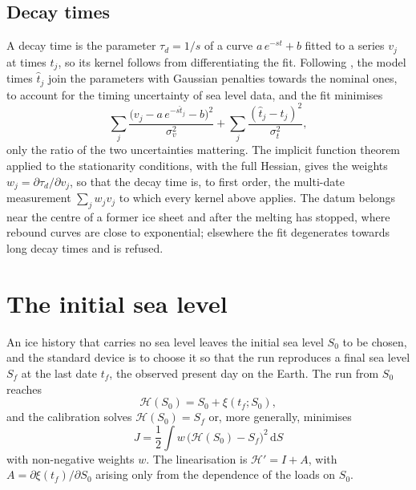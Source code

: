 \documentclass[11pt,a4paper]{article}
\newcommand{\dd}{\mathrm{d}}
\numberwithin{equation}{section}
\begin{document}
\subsection{Decay times}

A decay time is the parameter $\tau_{d}=1/s$ of a curve $a\,e^{-st}+b$ fitted
to a series $v_{j}$ at times $t_{j}$, so its kernel follows from differentiating
the fit. Following \citet[Appendix C]{AlAttarTromp2014}, the model times
$\hat t_{j}$ join the parameters with Gaussian penalties towards the nominal
ones, to account for the timing uncertainty of sea level data, and the fit
minimises
\begin{equation}
\sum_{j}\frac{\big(v_{j} - a\,e^{-s\hat t_{j}} - b\big)^{2}}{\sigma_{v}^{2}}
 + \sum_{j}\frac{(\hat t_{j}-t_{j})^{2}}{\sigma_{t}^{2}},
\end{equation}
only the ratio of the two uncertainties mattering. The implicit function
theorem applied to the stationarity conditions, with the full Hessian, gives
the weights $w_{j} = \partial\tau_{d}/\partial v_{j}$, so that the decay time is,
to first order, the multi-date measurement $\sum_{j}w_{j}v_{j}$ to which every
kernel above applies. The datum belongs near the centre of a former ice sheet
and after the melting has stopped, where rebound curves are close to
exponential; elsewhere the fit degenerates towards long decay times and is
refused.

\section{The initial sea level}
\label{sec:calibration}

An ice history that carries no sea level leaves the initial sea level $S_{0}$
to be chosen, and the standard device is to choose it so that the run
reproduces a final sea level $S_{f}$ at the last date $t_{f}$, the observed
present day on the Earth. The run from $S_{0}$ reaches
\begin{equation}
\mathcal{H}(S_{0}) = S_{0} + \xi(t_{f};S_{0}),
\end{equation}
and the calibration solves $\mathcal{H}(S_{0}) = S_{f}$ or, more generally,
minimises
\begin{equation}
J = \frac{1}{2}\int w\,\big(\mathcal{H}(S_{0}) - S_{f}\big)^{2}\,\dd S
\label{eq:calmisfit}
\end{equation}
with non-negative weights $w$. The linearisation is $\mathcal{H}' = I + A$,
with $A = \partial\xi(t_{f})/\partial S_{0}$ arising only from the dependence of
the loads on $S_{0}$.
\end{document}
